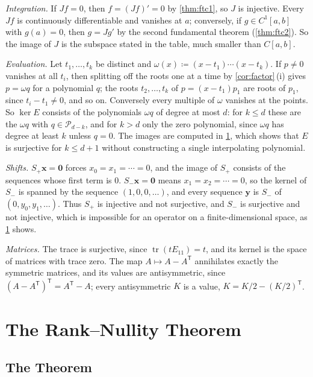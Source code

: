 \emph{Integration.} If $Jf=0$, then $f=(Jf)'=0$ by \cref{thm:ftc1}, so $J$ is injective. Every $Jf$ is continuously differentiable and vanishes at $a$; conversely, if $g\in C^1[a,b]$ with $g(a)=0$, then $g=Jg'$ by the second fundamental theorem (\cref{thm:ftc2}). So the image of $J$ is the subspace stated in the table, much smaller than $C[a,b]$.

\emph{Evaluation.} Let $t_1,\ldots,t_k$ be distinct and $\omega(x)\coloneqq(x-t_1)\cdots(x-t_k)$. If $p\ne0$ vanishes at all $t_i$, then splitting off the roots one at a time by \cref{cor:factor}\,(i) gives $p=\omega q$ for a polynomial $q$; the roots $t_2,\ldots,t_k$ of $p=(x-t_1)p_1$ are roots of $p_1$, since $t_i-t_1\ne0$, and so on. Conversely every multiple of $\omega$ vanishes at the points. So $\ker E$ consists of the polynomials $\omega q$ of degree at most $d$: for $k\le d$ these are the $\omega q$ with $q\in\mathcal P_{d-k}$, and for $k>d$ only the zero polynomial, since $\omega q$ has degree at least $k$ unless $q=0$. The images are computed in \cref{sec:rank-nullity}, which shows that $E$ is surjective for $k\le d+1$ without constructing a single interpolating polynomial.

\emph{Shifts.} $S_+\mathbf x=\mathbf 0$ forces $x_0=x_1=\cdots=0$, and the image of $S_+$ consists of the sequences whose first term is $0$. $S_-\mathbf x=\mathbf 0$ means $x_1=x_2=\cdots=0$, so the kernel of $S_-$ is spanned by the sequence $(1,0,0,\ldots)$, and every sequence $\mathbf y$ is $S_-$ of $(0,y_0,y_1,\ldots)$. Thus $S_+$ is injective and not surjective, and $S_-$ is surjective and not injective, which is impossible for an operator on a finite-dimensional space, as \cref{sec:rank-nullity} shows.

\emph{Matrices.} The trace is surjective, since $\operatorname{tr}(tE_{11})=t$, and its kernel is the space of matrices with trace zero. The map $A\mapsto A-A^{\mathsf T}$ annihilates exactly the symmetric matrices, and its values are antisymmetric, since $(A-A^{\mathsf T})^{\mathsf T}=A^{\mathsf T}-A$; every antisymmetric $K$ is a value, $K=K/2-(K/2)^{\mathsf T}$.

\section{The Rank--Nullity Theorem}
\label{sec:rank-nullity}

\subsection{The Theorem}

